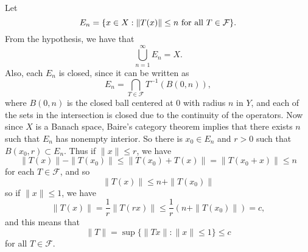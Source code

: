 \documentclass[12pt]{article}
\begin{document}
Let
$$E_n = \{x\in X: \|T(x)\|\leq n\textnormal{ for all }T\in \mathcal{F}\}.$$
From the hypothesis, we have that
$$\bigcup_{n=1}^\infty E_n = X.$$
Also, each $E_n$ is closed, since it can be written as
$$E_n = \bigcap_{T\in\mathcal{F}}{T^{-1}(B(0,n))},$$
where $B(0,n)$ is the closed ball centered at $0$ with radius $n$ in $Y$,
and each of the sets in the intersection is closed due to the continuity of the operators.
Now since $X$ is a Banach space, Baire's category theorem 
implies that there exists $n$ such that $E_n$ has
nonempty interior. So there is $x_0\in E_n$ and $r>0$ such 
that $B(x_0,r)\subset E_n$. Thus if $\|x\|\leq r$, we have
$$\|T(x)\|-\|T(x_0)\|\leq \|T(x_0)+T(x)\|=\|T(x_0+x)\|\leq n$$
for each $T\in \mathcal{F}$, and so
$$\|T(x)\|\leq n+\|T(x_0)\|$$
so if $\|x\|\leq 1$, we have 
$$\|T(x)\|= \frac{1}{r}\|T(rx)\| \leq \frac{1}{r}\left(n+\|T(x_0)\|\right) = c,$$
and this means that
$$\|T\| = \sup\{\|Tx\|: \|x\|\leq 1\} \leq c$$
for all $T\in\mathcal{F}$.
\end{document}
